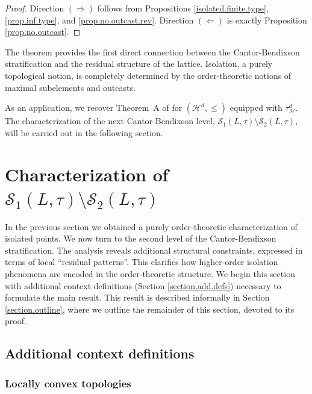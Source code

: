 \documentclass{article}
\begin{document}
{
\begin{proof}
Direction $(\Rightarrow)$ follows from Propositions \ref{isolated.finite.type}, \ref{prop.inf.type}, and \ref{prop.no.outcast.rev}. Direction $(\Leftarrow)$ is exactly Proposition \ref{prop.no.outcast}.
\end{proof}

The theorem provides the first direct connection between the Cantor-Bendixson stratification and the residual structure of the lattice. Isolation, a purely topological notion, is completely determined by the order-theoretic notions of maximal subelements and outcasts.

As an application, we recover Theorem~A of \cite{GN25} for \((\mathcal H^d,\leq)\) equipped with \(\tau_{\mathcal H}^d\). The characterization of the next Cantor-Bendixson level, \(\mathcal S_1(L,\tau)\setminus\mathcal S_2(L,\tau)\), will be carried out in the following section.}


\section{\label{section.lattice.proofs.2}Characterization of $\mathcal{S}_1(L,\tau) \setminus \mathcal{S}_2(L,\tau)$}

In the previous section we obtained a purely order-theoretic characterization of isolated points. We now turn to the second level of the Cantor-Bendixson stratification. The analysis reveals additional structural constraints, expressed in terms of 
local {``residual patterns''}.
This clarifies how higher-order isolation phenomena are encoded in the {order-theoretic} %
structure. {We begin this section with additional context definitions (Section \ref{section.add.defs}) necessary to formulate the main result. This result is described informally in Section \ref{section.outline}, where we outline the remainder of this section, devoted to its proof.}

{
\subsection{Additional context definitions\label{section.add.defs}}
}

\subsubsection{Locally convex topologies}
\end{document}
